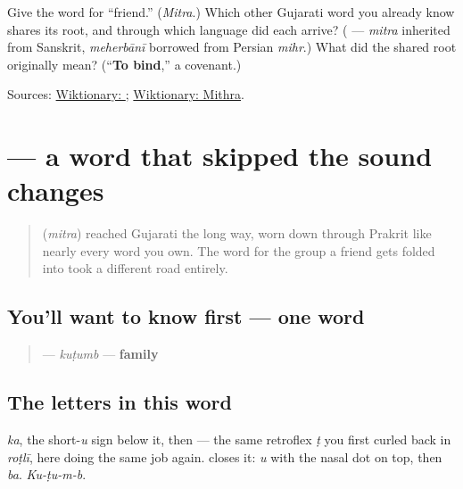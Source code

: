 \begin{tcolorbox}[breakable,colback=teal!4,colframe=teal!35!black,title={Before you move on}]
Give the word for \textquotedblleft{}friend.\textquotedblright{} (\emph{Mitra}.) Which other Gujarati word you already know shares its root, and through which language did each arrive? (\textbf{} — \emph{mitra} inherited from Sanskrit, \emph{meherbānī} borrowed from Persian \emph{mihr}.) What did the shared root originally mean? (\textquotedblleft{}\textbf{To bind},\textquotedblright{} a covenant.)

Sources: \href{https://en.wiktionary.org/wiki/\%E0\%AA\%AE\%E0\%AA\%BF\%E0\%AA\%A4\%E0\%AB\%8D\%E0\%AA\%B0}{Wiktionary: }; \href{https://en.wiktionary.org/wiki/Mithra}{Wiktionary: Mithra}.
\end{tcolorbox}
\section[\texorpdfstring{\gu{કુટુંબ} (kuṭumb)}{કુટુંબ (kuṭumb)}]{ — a word that skipped the sound changes}

\label{lesson:GU-C11-kutumb}



\begin{quote}
\textbf{} (\emph{mitra}) reached Gujarati the long way, worn down through Prakrit like nearly every word you own. The word for the group a friend gets folded into took a different road entirely.
\end{quote}

\subsection*{You'll want to know first — one word}
\begin{quote}
\textbf{} — \emph{kuṭumb} — \textbf{family}
\end{quote}

\subsection*{The letters in this word}
\textbf{} \emph{ka}, \textbf{} the short-\emph{u} sign below it, then \textbf{} — the same retroflex \emph{ṭ} you first curled back in \emph{roṭlī}, here doing the same job again. \textbf{} closes it: \emph{u} with the nasal dot on top, then \textbf{} \emph{ba}. \emph{Ku-ṭu-m-b}.

